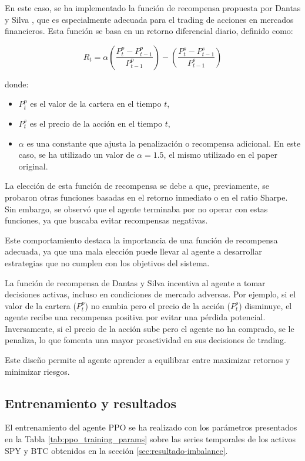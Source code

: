 \documentclass[a4paper,12pt, twoside]{report}
\begin{document}
En este caso, se ha implementado la función de recompensa propuesta por Dantas y Silva \cite{Dantas2018}, 
que es especialmente adecuada para el trading de acciones en mercados financieros. Esta función 
se basa en un retorno diferencial diario, definido como:

\[
R_t = \alpha \left(\frac{P^p_t - P^p_{t-1}}{P^p_{t-1}}\right) - \left(\frac{P^s_t - P^s_{t-1}}{P^s_{t-1}}\right)
\]

donde:
\begin{itemize}
    \item \( P^p_t \) es el valor de la cartera en el tiempo \( t \),
    \item \( P^s_t \) es el precio de la acción en el tiempo \( t \),
    \item \( \alpha \) es una constante que ajusta la penalización o recompensa adicional. 
    En este caso, se ha utilizado un valor de \( \alpha = 1.5 \), el mismo utilizado en el paper original.
\end{itemize}

La elección de esta función de recompensa se debe a que, previamente, se probaron otras funciones 
basadas en el retorno inmediato o en el ratio Sharpe. Sin embargo, se observó que el agente terminaba 
por no operar con estas funciones, ya que buscaba evitar recompensas negativas. 

Este comportamiento destaca la importancia de una función de recompensa adecuada, ya que una mala 
elección puede llevar al agente a desarrollar estrategias que no cumplen con los objetivos del sistema.

La función de recompensa de Dantas y Silva incentiva al agente a tomar decisiones activas, incluso 
en condiciones de mercado adversas. Por ejemplo, si el valor de la cartera (\( P^p_t \)) no 
cambia pero el precio de la acción (\( P^s_t \)) disminuye, el agente recibe una recompensa positiva 
por evitar una pérdida potencial. Inversamente, si el precio de la acción sube pero el agente no 
ha comprado, se le penaliza, lo que fomenta una mayor proactividad en sus decisiones de trading.

Este diseño permite al agente aprender a equilibrar entre maximizar retornos y minimizar riesgos.
\subsection{Entrenamiento y resultados}

El entrenamiento del agente PPO se ha realizado con los parámetros presentados en la Tabla \ref{tab:ppo_training_params} 
sobre las series temporales de los activos SPY y BTC obtenidos en la sección \ref{sec:resultado-imbalance}. 
\end{document}
